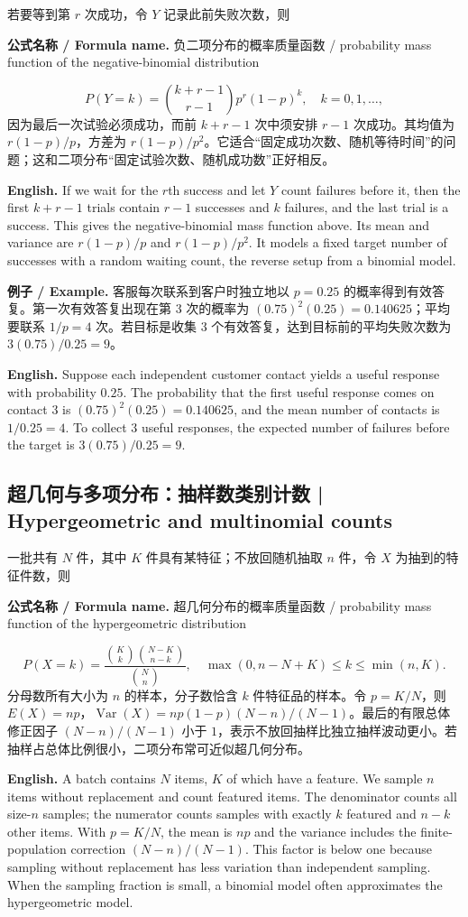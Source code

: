 \documentclass[UTF8,11pt,a4paper]{ctexart}
\newcommand{\EN}[1]{\par\noindent\textbf{English.} #1\par}
\newcommand{\FORMULA}[2]{\par\noindent\textbf{公式名称 / Formula name.} #1 / #2\par}
\newcommand{\EX}[2]{\par\noindent\textbf{例子 / Example.} #1\par\EN{#2}}
\begin{document}
若要等到第 $r$ 次成功，令 $Y$ 记录此前失败次数，则
\FORMULA{负二项分布的概率质量函数}{probability mass function of the negative-binomial distribution}
\[
P(Y=k)=\binom{k+r-1}{r-1}p^r(1-p)^k,\quad k=0,1,\ldots,
\]
因为最后一次试验必须成功，而前 $k+r-1$ 次中须安排 $r-1$ 次成功。其均值为 $r(1-p)/p$，方差为 $r(1-p)/p^2$。它适合“固定成功次数、随机等待时间”的问题；这和二项分布“固定试验次数、随机成功数”正好相反。
\EN{If we wait for the $r$th success and let $Y$ count failures before it, then the first $k+r-1$ trials contain $r-1$ successes and $k$ failures, and the last trial is a success. This gives the negative-binomial mass function above. Its mean and variance are $r(1-p)/p$ and $r(1-p)/p^2$. It models a fixed target number of successes with a random waiting count, the reverse setup from a binomial model.}

\EX{客服每次联系到客户时独立地以 $p=0.25$ 的概率得到有效答复。第一次有效答复出现在第 3 次的概率为 $(0.75)^2(0.25)=0.140625$；平均要联系 $1/p=4$ 次。若目标是收集 3 个有效答复，达到目标前的平均失败次数为 $3(0.75)/0.25=9$。}{Suppose each independent customer contact yields a useful response with probability $0.25$. The probability that the first useful response comes on contact 3 is $(0.75)^2(0.25)=0.140625$, and the mean number of contacts is $1/0.25=4$. To collect 3 useful responses, the expected number of failures before the target is $3(0.75)/0.25=9$.}

\subsection{超几何与多项分布：抽样数类别计数 | Hypergeometric and multinomial counts}
一批共有 $N$ 件，其中 $K$ 件具有某特征；不放回随机抽取 $n$ 件，令 $X$ 为抽到的特征件数，则
\FORMULA{超几何分布的概率质量函数}{probability mass function of the hypergeometric distribution}
\[
P(X=k)=\frac{\binom Kk\binom{N-K}{n-k}}{\binom Nn},
\quad \max(0,n-N+K)\le k\le\min(n,K).
\]
分母数所有大小为 $n$ 的样本，分子数恰含 $k$ 件特征品的样本。令 $p=K/N$，则 $E(X)=np$，$\operatorname{Var}(X)=np(1-p)(N-n)/(N-1)$。最后的有限总体修正因子 $(N-n)/(N-1)$ 小于 $1$，表示不放回抽样比独立抽样波动更小。若抽样占总体比例很小，二项分布常可近似超几何分布。
\EN{A batch contains $N$ items, $K$ of which have a feature. We sample $n$ items without replacement and count featured items. The denominator counts all size-$n$ samples; the numerator counts samples with exactly $k$ featured and $n-k$ other items. With $p=K/N$, the mean is $np$ and the variance includes the finite-population correction $(N-n)/(N-1)$. This factor is below one because sampling without replacement has less variation than independent sampling. When the sampling fraction is small, a binomial model often approximates the hypergeometric model.}
\end{document}
